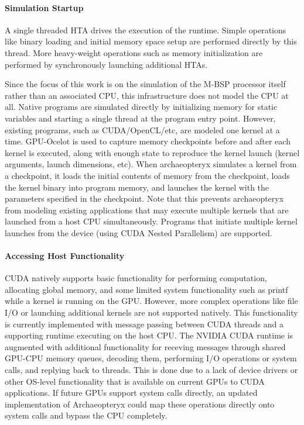 \documentclass[conference, 10pt]{IEEEtran}
\begin{document}
\paragraph{Simulation Startup}
A single threaded HTA drives the execution of the runtime.
Simple operations like binary loading and initial memory space setup are
performed directly by this thread.  More heavy-weight operations such as memory
initialization are performed by synchronously launching additional HTAs.

Since the focus of this work is on the simulation of the M-BSP processor itself
rather than an associated CPU, this infrastructure does not model the CPU at
all.  Native programs are simulated directly by initializing memory for static
variables and starting a single thread at the program entry point.  However,
existing programs, such as CUDA/OpenCL/etc, are modeled one kernel at a time.  
GPU-Ocelot is used to capture memory checkpoints before and after each kernel
is executed, along with enough state to reproduce the kernel launch (kernel
arguments, launch dimensions, etc).  When archaeopteryx simulates a kernel
from a checkpoint, it loads the initial contents of memory from the checkpoint,
loads the kernel binary into program memory, and launches the kernel with
the parameters specified in the checkpoint.  Note that this prevents
archaeopteryx from modeling existing applications that may execute multiple
kernels that are launched from a host CPU simultaneously.  Programs that
initiate multiple kernel launches from the device (using CUDA Nested
Parallelism) are supported.

\paragraph{Accessing Host Functionality}
CUDA natively supports basic functionality for performing computation,
allocating global memory, and some limited system functionality such as printf
while a kernel is running on the GPU.  However, more complex operations like
file I/O or launching additional kernels are not supported natively. 
This functionality is currently implemented with message passing between
CUDA threads and a supporting runtime executing on the host CPU.  The NVIDIA
CUDA runtime is augmented with additional functionality for receving messages
through shared GPU-CPU memory queues, decoding them, performing I/O operations
or system calls, and replying back to threads.  This is done due to a lack of
device drivers or other OS-level functionality that is available on current GPUs
to CUDA applications. If future GPUs support system calls directly, an updated
implementation of Archaeopteryx could map these operations directly onto system
calls and bypass the CPU completely.
\end{document}
